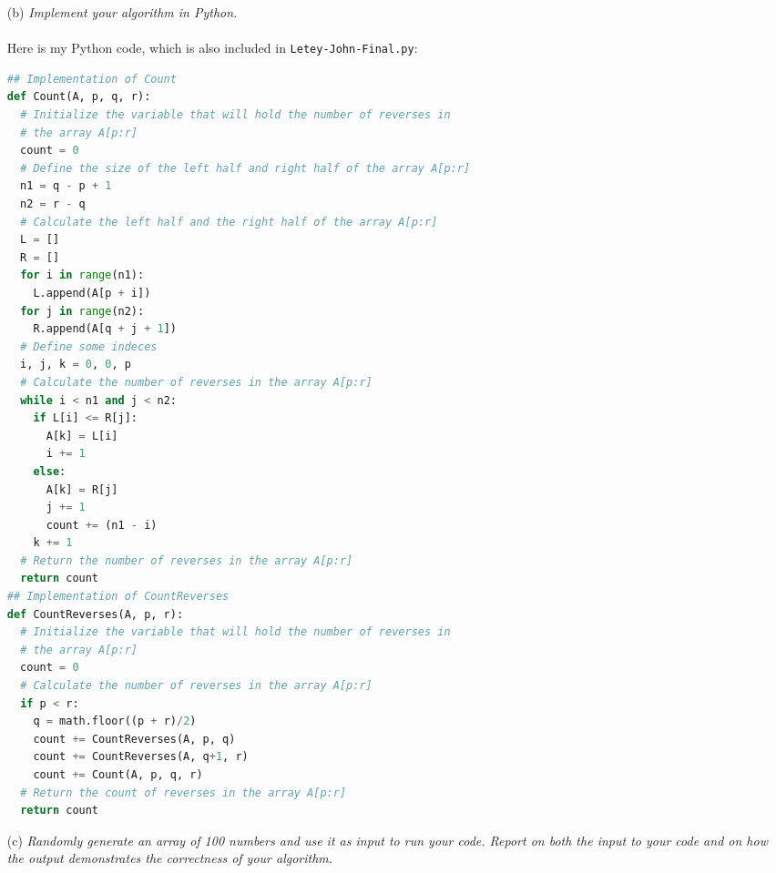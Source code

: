 \documentclass[12pt]{article}
\begin{document}
{\begin{enumerate}
\begin{lstlisting}
  for i = 1 to n1
    L[i] = A[p + i - 1]
  for j = 1 to n2
    R[j] = A[q + j]
  L[n1 + 1] = infinity
  R[n2 + 1] = infinity
  i = 1
  j = 1
  for k = p to r
    if L[i] <= R[j]
      A[k] = L[i]
      i = i + 1
    else 
      A[k] = R[j]
      j = j + 1
\end{lstlisting}
The pseudocode for the \texttt{Merge} procedure won't need a lot of changes. All I need to do is add a counter for it to return. I will also be getting rid of lines 8 and 9 of the pseudocode.
\item[(b)]\textsl{Implement your algorithm in Python.}\\ \\
Here is my Python code, which is also included in \texttt{Letey-John-Final.py}:
\begin{lstlisting}[language=Python]
## Implementation of Count
def Count(A, p, q, r):
  # Initialize the variable that will hold the number of reverses in 
  # the array A[p:r]
  count = 0
  # Define the size of the left half and right half of the array A[p:r]
  n1 = q - p + 1
  n2 = r - q
  # Calculate the left half and the right half of the array A[p:r]
  L = []
  R = []
  for i in range(n1):
    L.append(A[p + i])
  for j in range(n2):
    R.append(A[q + j + 1])
  # Define some indeces
  i, j, k = 0, 0, p
  # Calculate the number of reverses in the array A[p:r]
  while i < n1 and j < n2:
    if L[i] <= R[j]:
      A[k] = L[i]
      i += 1
    else:
      A[k] = R[j]
      j += 1
      count += (n1 - i)
    k += 1
  # Return the number of reverses in the array A[p:r]
  return count
## Implementation of CountReverses
def CountReverses(A, p, r):
  # Initialize the variable that will hold the number of reverses in
  # the array A[p:r]
  count = 0
  # Calculate the number of reverses in the array A[p:r]
  if p < r:
    q = math.floor((p + r)/2)
    count += CountReverses(A, p, q)
    count += CountReverses(A, q+1, r)
    count += Count(A, p, q, r)
  # Return the count of reverses in the array A[p:r]
  return count
\end{lstlisting}
\item[(c)]\textsl{Randomly generate an array of 100 numbers and use it as input to run your code. Report on both the input to your code and on how the output demonstrates the correctness of your algorithm.}\\ \\
    

\end{enumerate}}
\end{document}

